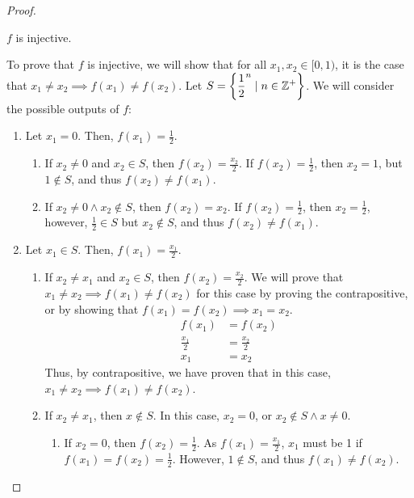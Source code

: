\documentclass[11pt]{scrartcl}
\theoremstyle{dotlessP}
\theoremstyle{dotlessN}
\DeclarePairedDelimiter\set{\{}{\}}
\newcommand{\ints}{\mathbb{Z}}
\begin{document}
\begin{proof} \
	\begin{claim*}
		$f$ is injective.
	\end{claim*}
	\begin{subproof}
		[Subproof]
		To prove that $f$ is injective, we will show that for all $x_1, x_2 \in [0,1)$, it is the case that $x_1 \neq x_2 \implies f(x_1) \neq f(x_2)$. Let $S = \set*{\displaystyle\frac{1}{2}^n \mid n \in \ints^+}$. We will consider the possible outputs of $f$:
		\begin{enumerate}
			\item Let $x_1 = 0$. Then, $f(x_1) = \displaystyle\frac{1}{2}$. 
				\begin{enumerate}
					\item If $x_2 \neq 0$ and $x_2 \in S$, then $f(x_2) = \displaystyle\frac{x_2}{2}$. If $f(x_2) = \displaystyle\frac{1}{2}$, then $x_2 = 1$, but $1 \not \in S$, and thus $f(x_2) \neq f(x_1)$.
					\item If $x_2 \neq 0 \land x_2\not\in S$, then $f(x_2) = x_2$. If $f(x_2) = \displaystyle\frac{1}{2}$, then $x_2 = \displaystyle\frac{1}{2}$, however, $\displaystyle\frac{1}{2} \in S$ but $x_2 \not\in S$, and thus $f(x_2) \neq f(x_1)$.
				\end{enumerate}
			\item Let $x_1 \in S$. Then, $f(x_1) = \displaystyle\frac{x_1}{2}$. 
\begin{enumerate}
	\item If $x_2 \neq x_1$ and $x_2 \in S$, then $f(x_2) = \displaystyle\frac{x_2}{2}$. We will prove that $x_1 \neq x_2 \implies f(x_1) \neq f(x_2)$ for this case by proving the contrapositive, or by showing that $f(x_1) = f(x_2) \implies x_1 = x_2$.
		\begin{align*}
			f(x_1) &= f(x_2) \\
			\frac{x_1}{2} &= \frac{x_2}{2} \\
			x_1 &= x_2
		\end{align*}
		Thus, by contrapositive, we have proven that in this case, $x_1 \neq x_2 \implies f(x_1) \neq f(x_2)$.
	\item If $x_2 \neq x_1$, then $x \not \in S$. In this case, $x_2 = 0$, or $x_2 \not\in S \land x \neq 0$.
		\begin{enumerate}
			\item If $x_2 = 0$, then $f(x_2) = \displaystyle\frac{1}{2}$. As $f(x_1) = \displaystyle\frac{x_1}{2}$, $x_1$ must be 1 if $f(x_1) = f(x_2) = \displaystyle\frac{1}{2}$. However, $1 \not \in S$, and thus $f(x_1) \neq f(x_2)$.

\end{enumerate}
\end{enumerate}
\end{enumerate}
\end{subproof}
\end{proof}
\end{document}
